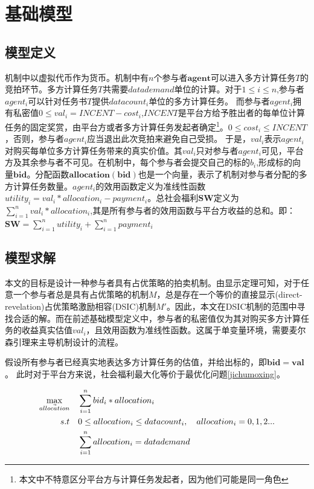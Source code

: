 \documentclass[promaster]{thesis-uestc}
\begin{document}
\section{基础模型}

\subsection{模型定义}
\label{jichumoxingdingyi}

机制中以虚拟代币作为货币。机制中有$n$个参与者$\mathbf{agent}$可以进入多方计算任务$T$的竞拍环节。多方计算任务$T$共需要$datademand$单位的计算。对于$1\leq i\leq n$,参与者$agent_i$可以针对任务书$T$提供$datacount_i$单位的多方计算任务。
而参与者$agent_i$拥有私密值$0 \leq val_i = INCENT-cost_i$,$INCENT$是平台方给予胜出者的每单位计算任务的固定奖赏，由平台方或者多方计算任务发起者确定\footnote{本文中不特意区分平台方与计算任务发起者，因为他们可能是同一角色}。$0 \leq cost_i \leq INCENT$，否则，参与者$agent_i$应当退出此次竞拍来避免自己受损。 于是，$val_i$表示$agent_i$对购买每单位多方计算任务带来的真实价值。其$val_i$只对参与者$agent_i$可见，平台方及其余参与者不可见。在机制中，每个参与者会提交自己的标的$b_i$,形成标的向量$\mathbf{bid}$。分配函数$\mathbf{allocation}(\mathbf{bid})$也是一个向量，表示了机制对参与者分配的多方计算任务数量。$agent_i$的效用函数定义为准线性函数$utility_i = val_i*allocation_i-payment_i$。总社会福利$\mathbf{SW}$定义为$\sum_{i=1}^n{val_i*allocation_i}$,其是所有参与者的效用函数与平台方收益的总和。即：$\mathbf{SW} = \sum_{i=1}^n{utility_i}+\sum_{i=1}^{n}{payment_i}$

\subsection{模型求解}
本文的目标是设计一种参与者具有占优策略的拍卖机制。由显示定理可知，对于任意一个参与者总是具有占优策略的机制$M$，总是存在一个等价的直接显示(direct-revelation)占优策略激励相容(DSIC)机制$M'$。因此，本文在DSIC机制的范围中寻找合适的解。而在前述基础模型定义中，参与者的私密值仅为其对购买多方计算任务的收益真实估值$val_i$，且效用函数为准线性函数。这属于单变量环境，需要麦尔森引理来主导机制设计的流程。

假设所有参与者已经真实地表达多方计算任务的估值，并给出标的，即$\mathbf{bid} = \mathbf{val}$。 此时对于平台方来说，社会福利最大化等价于最优化问题\ref{jichumoxing}。

\begin{align}
    \label{jichumoxing}\max_{\vec{allocation}} \quad&\sum_{i=1}^{n}{bid_i*allocation_i}\\
    s.t                     \quad& 0\leq allocation_i\leq datacount_i,\quad allocation_i = {0,1,2...}\notag\\
                            \quad& \sum_{i=1}^{n}{allocation_i} = datademand\notag 
\end{align}
\end{document}
